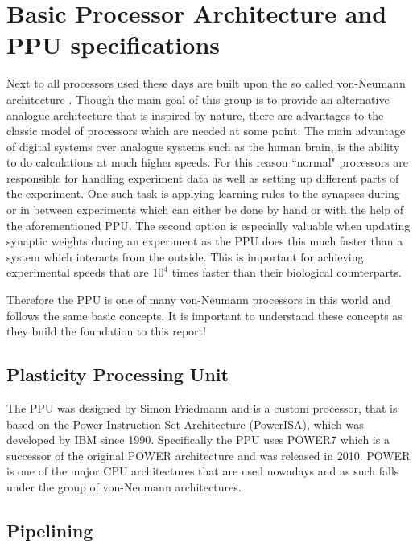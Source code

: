 \chapter{Basic Processor Architecture and PPU specifications}
\label{chapter:processor}

Next to all processors used these days are built upon the so called von-Neumann architecture .
Though the main goal of this group is to provide an alternative analogue architecture that is inspired by nature, there are advantages to the classic model of processors which are needed at some point.
The main advantage of digital systems over analogue systems such as the human brain, is the ability to do calculations at much higher speeds.
For this reason ``normal" processors are responsible for handling experiment data as well as setting up different parts of the experiment.
One such task is applying learning rules to the synapses during or in between experiments which can either be done by hand or with the help of the aforementioned PPU.
The second option is especially valuable when updating synaptic weights during an experiment as the PPU does this much faster than a system which interacts from the outside.
This is important for achieving experimental speeds that are $10^{4}$ times faster than their biological counterparts.

Therefore the PPU is one of many von-Neumann processors in this world and follows the same basic concepts.
It is important to understand these concepts as they build the foundation to this report!

\section{Plasticity Processing Unit}
The PPU was designed by Simon Friedmann  and is a custom processor, that is based on the Power Instruction Set Architecture (PowerISA), which was developed by IBM since 1990.
Specifically the PPU uses POWER7 which is a successor of the original POWER architecture and was released in 2010.
POWER is one of the major CPU architectures that are used nowadays and as such falls under the group of von-Neumann architectures.


\section{Pipelining}

